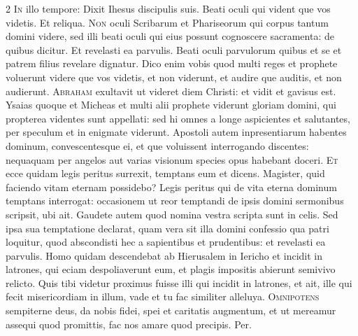 \begin{multicols*}{2}
\lettrine[lines=2]{\zallmancaps \color{Blue} I}{n} illo tempore: Dixit Ihesus discipulis suis. Beati oculi qui vident que vos videtis. Et reliqua.
 \grecross
\lettrine[lines=2]{\zallmancaps \color{Red} N}{on} oculi Scribarum et Phariseorum qui corpus tantum domini videre, sed illi beati oculi qui eius possunt cognoscere sacramenta: de quibus dicitur. Et revelasti ea parvulis. Beati oculi parvulorum quibus et se et patrem filius revelare dignatur. Dico enim vobis quod multi reges et prophete voluerunt videre que vos videtis, et non viderunt, et audire que auditis, et non audierunt.
\lettrine[lines=2]{\zallmancaps \color{Blue} A}{braham} exultavit ut videret diem Christi: et vidit et gavisus est. Ysaias quoque et Micheas et multi alii prophete viderunt gloriam domini, qui propterea videntes sunt appellati: sed hi omnes a longe aspicientes et salutantes, per speculum et in enigmate viderunt. Apostoli autem inpresentiarum habentes dominum, convescentesque ei, et que voluissent interrogando discentes: nequaquam per angelos aut varias visionum species opus habebant doceri.
\lettrine[lines=2]{\zallmancaps \color{Red} E}{t} ecce quidam legis peritus surrexit, temptans eum et dicens. Magister, quid faciendo vitam eternam possidebo? Legis peritus qui de vita eterna dominum temptans interrogat: occasionem ut reor temptandi de ipsis domini sermonibus scripsit, ubi ait. Gaudete autem quod nomina vestra scripta sunt in celis. Sed ipsa sua temptatione declarat, quam vera sit illa domini confessio qua patri loquitur, quod abscondisti hec a sapientibus et prudentibus: et revelasti ea parvulis.
 Homo quidam descendebat ab Hierusalem in Iericho et incidit in latrones, qui eciam despoliaverunt eum, et plagis impositis abierunt semivivo relicto.
 Quis tibi videtur proximus fuisse illi qui incidit in latrones, et ait, ille qui fecit misericordiam in illum, vade et tu fac similiter alleluya.
\lettrine[lines=2]{\zallmancaps \color{Blue} O}{mnipotens} sempiterne deus, da nobis fidei, spei et caritatis augmentum, et ut mereamur assequi quod promittis, fac nos amare quod precipis. Per.

\end{multicols*}

